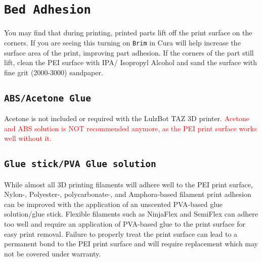 
\section{\texttt{Bed Adhesion}}
You may find that during printing, printed parts lift off the print surface on the corners. If you are seeing this turning on \texttt{Brim} in Cura will help increase the surface area of the print, improving part adhesion. If the corners of the part still lift, clean the PEI surface with IPA/ Isopropyl Alcohol and sand the surface with fine grit (2000-3000) sandpaper. 


\subsection{\texttt{ABS/Acetone Glue}}
\label{sec:ABS/Acetone Glue}

Acetone is not included or required with the LulzBot TAZ 3D printer. \textcolor{red}{Acetone and ABS solution is NOT recommended anymore, as the PEI print surface works well without it.}

\subsection{\texttt{Glue stick/PVA Glue solution}}
\label{sec:Glue stick/PVA Glue solution}
While almost all 3D printing filaments will adhere well to the PEI print surface, Nylon-, Polyester-, polycarbonate-, and Amphora\textsuperscript{\miniscule{\texttrademark}}-based filament print adhesion can be improved with the application of an unscented PVA-based glue solution/glue stick. Flexible filaments such as NinjaFlex\textsuperscript{\miniscule{\textregistered}} and SemiFlex\textsuperscript{\miniscule{\texttrademark}} can adhere too well and require an application of PVA-based glue to the print surface for easy print removal. Failure to properly treat the print surface can lead to a permanent bond to the PEI print surface and will require replacement which may not be covered under warranty.

